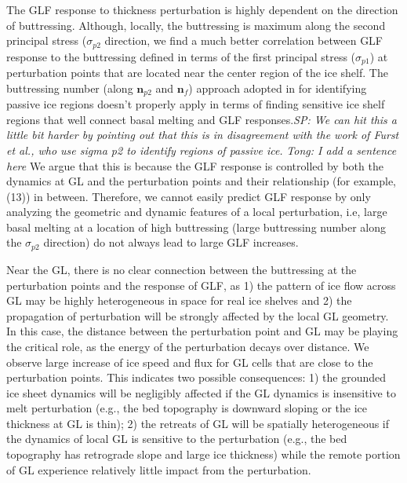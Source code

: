 \documentclass[tc, manuscript]{copernicus}
\begin{document}
The GLF response to thickness perturbation is highly dependent on the direction of buttressing. Although, locally, the buttressing is maximum along the second principal stress ($\sigma_{p2}$ direction, we find a much better correlation between GLF response to the buttressing defined in terms of the first principal stress ($\sigma_{p1}$) at perturbation points that are located near the center region of the ice shelf. The buttressing number (along $\mathbf{n}_{p2}$ and $\mathbf{n}_f$) approach adopted in \citet{furst2016} for identifying passive ice regions doesn't properly apply in terms of finding sensitive ice shelf regions that well connect basal melting and GLF responses.\textit{SP: We can hit this a little bit harder by pointing out that this is in disagreement with the work of Furst et al., who use sigma p2 to identify regions of passive ice.} \textit{Tong: I add a sentence here}  We argue that this is because the GLF response is controlled by both the dynamics at GL and the perturbation points and their relationship (for example, (13)) in between. Therefore, we cannot easily predict GLF response by only analyzing the geometric and dynamic features of a local perturbation, i.e, large basal melting at a location of high buttressing (large buttressing number along the $\sigma_{p2}$ direction) do not always lead to large GLF increases.

Near the GL, there is no clear connection between the buttressing at the perturbation points and the response of GLF, as 1) the pattern of ice flow across GL may be highly heterogeneous in space for real ice shelves and 2) the propagation of perturbation will be strongly affected by the local GL geometry. In this case, the distance between the perturbation point and GL may be playing the critical role, as the energy of the perturbation decays over distance. We observe large increase of ice speed and flux for GL cells that are close to the perturbation points. This indicates two possible consequences: 1) the grounded ice sheet dynamics will be negligibly affected if the GL dynamics is insensitive to melt perturbation (e.g., the bed topography is downward sloping or the ice thickness at GL is thin); 2) the retreats of GL will be spatially heterogeneous if the dynamics of local GL is sensitive to the perturbation (e.g., the bed topography has retrograde slope and large ice thickness) while the remote portion of GL experience relatively little impact from the perturbation.
\end{document}
